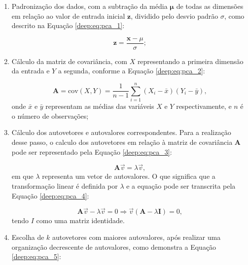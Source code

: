 \begin{enumerate}
    \item Padronização dos dados, com a subtração da média $\boldsymbol{\mu}$ de todas as dimensões em relação ao valor de entrada inicial $\boldsymbol{z}$, dividido pelo desvio padrão $\sigma$, como descrito na Equação \ref{deep:eq:pca_1}:

    \begin{equation}
        \label{deep:eq:pca_1}
        \boldsymbol{z} = \frac{\boldsymbol{x} - \mu}{\sigma};
    \end{equation}

    \item Cálculo da matriz de covariância, com $X$ representando a primeira dimensão da entrada e $Y$ a segunda, conforme a Equação \ref{deep:eq:pca_2}:
    
    \begin{equation}
        \label{deep:eq:pca_2}
        \boldsymbol{A} = \text{cov}(X, Y) = \frac{1}{n-1} \sum_{i=1}^{n} (X_i - \bar{x}) (Y_i - \bar{y}),
    \end{equation}
    onde \(\bar{x}\) e \(\bar{y}\) representam as médias das variáveis $X$ e $Y$ respectivamente, e $n$ é o número de observações;

    \item Cálculo dos autovetores e autovalores correspondentes. Para a realização desse passo, o calculo dos autovetores em relação à matriz de covariância $\boldsymbol{A}$ pode ser representado pela Equação \ref{deep:eq:pca_3}:

    \begin{equation}
        \label{deep:eq:pca_3}
        \boldsymbol{A}\overrightarrow{v} = \lambda\overrightarrow{v},
    \end{equation}
    em que $\lambda$ representa um vetor de autovalores. O que significa que a transformação linear é definida por $\lambda$ e a equação pode ser transcrita pela Equação \ref{deep:eq:pca_4}:

        \begin{equation}
        \label{deep:eq:pca_4}
        \boldsymbol{A}\overrightarrow{v} - \lambda\overrightarrow{v} = 0
        \Rightarrow \overrightarrow{v}(\boldsymbol{A} - \lambda \boldsymbol{I}) = 0,
    \end{equation}
    tendo $I$ como uma matriz identidade.

    \item Escolha de $k$ autovetores com maiores autovalores, após realizar uma organização decrescente de autovalores, como demonstra a Equação \ref{deep:eq:pca_5}:


\end{enumerate}
